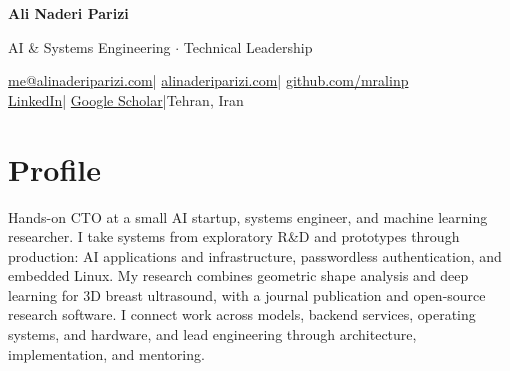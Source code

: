 \documentclass[10pt,a4paper]{article}
\begin{document}
\begin{center}
{\fontsize{25}{29}\selectfont\bfseries\color{primaryColor}Ali Naderi Parizi}\par
\vspace{3pt}
{\large AI \& Systems Engineering \enspace $\cdot$ \enspace Technical Leadership}\par
\vspace{4pt}
\href{mailto:me@alinaderiparizi.com}{me@alinaderiparizi.com}\enspace |\enspace
\href{https://alinaderiparizi.com}{alinaderiparizi.com}\enspace |\enspace
\href{https://github.com/mralinp}{github.com/mralinp}\\[2pt]
\href{https://www.linkedin.com/in/ali-naderi-parizi-5a0a74107/}{LinkedIn}\enspace |\enspace
\href{https://scholar.google.com/citations?user=2zycrawAAAAJ}{Google Scholar}\enspace |\enspace Tehran, Iran
\end{center}
\vspace{-6pt}

\section{Profile}
Hands-on CTO at a small AI startup, systems engineer, and machine learning researcher. I take systems from exploratory R\&D and prototypes through production: AI applications and infrastructure, passwordless authentication, and embedded Linux. My research combines geometric shape analysis and deep learning for 3D breast ultrasound, with a journal publication and open-source research software. I connect work across models, backend services, operating systems, and hardware, and lead engineering through architecture, implementation, and mentoring.
\end{document}
